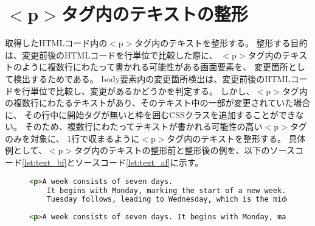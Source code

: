 \section{\texorpdfstring{$<$p$>$タグ内のテキストの整形}{pタグ内のテキストの整形}}\label{sec:text_change}
取得したHTMLコード内の$<$p$>$タグ内のテキストを整形する。
整形する目的は、変更前後のHTMLコードを行単位で比較した際に、
$<$p$>$タグ内のテキストのように複数行にわたって書かれる可能性がある画面要素を、
変更箇所として検出するためである。
body要素内の変更箇所検出は、変更前後のHTMLコードを行単位で比較し、変更があるかどうかを判定する。
しかし、$<$p$>$タグ内の複数行にわたるテキストがあり、そのテキスト中の一部が変更されていた場合に、
その行中に開始タグが無いと枠を囲むCSSクラスを追加することができない。
そのため、複数行にわたってテキストが書かれる可能性の高い$<$p$>$タグのみを対象に、
1行で収まるように$<$p$>$タグ内のテキストを整形する。
具体例として、$<$p$>$タグ内のテキストの整形前と整形後の例を、以下のソースコード\ref{lst:text_bf}とソースコード\ref{lst:text_af}に示す。
\begin{figure}[tp]
      \begin{lstlisting}[language=HTML, caption=$<$p$>$タグ内のテキストの整形前の例, label=lst:text_bf]
<p>A week consists of seven days. 
    It begins with Monday, marking the start of a new week. 
    Tuesday follows, leading to Wednesday, which is the middle of the week. </p>
\end{lstlisting}
\end{figure}

\begin{figure}[tp]
      \begin{lstlisting}[language=HTML, caption=$<$p$>$タグ内のテキストの整形後の例, label=lst:text_af]
<p>A week consists of seven days. It begins with Monday, marking the start of a new week. Tuesday follows, leading to Wednesday, which is the middle of the week. </p>
\end{lstlisting}
\end{figure}